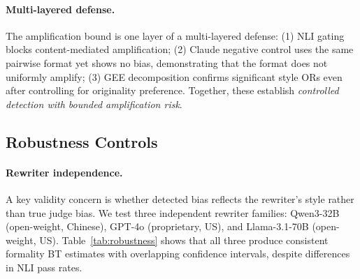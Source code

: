 \documentclass[11pt]{article}
\begin{document}
\paragraph{Multi-layered defense.}
The amplification bound is one layer of a multi-layered defense:
(1) NLI gating blocks content-mediated amplification;
(2) Claude negative control uses the same pairwise format yet shows no bias, demonstrating that the format does not uniformly amplify;
(3) GEE decomposition confirms significant style ORs even after controlling for originality preference.
Together, these establish \emph{controlled detection with bounded amplification risk}.

\subsection{Robustness Controls}

\paragraph{Rewriter independence.}
A key validity concern is whether detected bias reflects the rewriter's style rather than true judge bias.
We test three independent rewriter families: Qwen3-32B (open-weight, Chinese), GPT-4o (proprietary, US), and Llama-3.1-70B (open-weight, US).
Table~\ref{tab:robustness} shows that all three produce consistent formality BT estimates with overlapping confidence intervals, despite differences in NLI pass rates.
\end{document}
